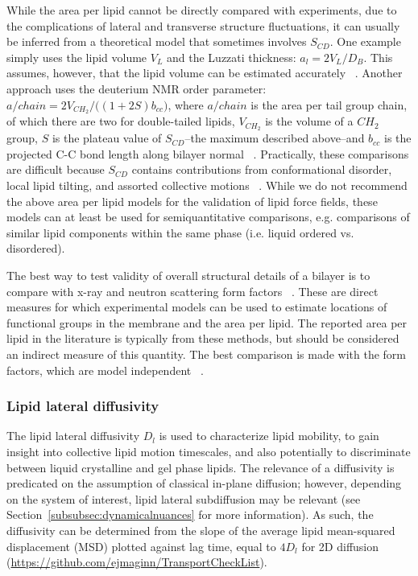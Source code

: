 \documentclass[9pt,bestpractices,pubversion]{livecoms}
\begin{document}
While the area per lipid cannot be directly compared with experiments, due to the complications of lateral and transverse structure fluctuations, it can usually be inferred from a theoretical model that sometimes involves $S_{CD}$.
One example simply uses the lipid volume $V_L$ and the Luzzati thickness: $a_l=2V_L/D_B$.
This assumes, however, that the lipid volume can be estimated accurately ~\cite{Poger2016}.
Another approach uses the deuterium NMR order parameter: $a/chain=2V_{CH_2}/\big((1+2S)b_{cc}\big)$, where $a/chain$ is the area per tail group chain, of which there are two for double-tailed lipids, $V_{CH_2}$ is the volume of a $CH_2$ group, $S$ is the plateau value of $S_{CD}$--the maximum described above--and $b_{cc}$ is the projected C-C bond length along bilayer normal ~\cite{Nagle1993}.
Practically, these comparisons are difficult because $S_{CD}$ contains contributions from conformational disorder, local lipid tilting, and assorted collective motions ~\cite{Venable2015}.
While we do not recommend the above area per lipid models for the validation of lipid force fields, these models can at least be used for semiquantitative comparisons, e.g. comparisons of similar lipid components within the same phase (i.e. liquid ordered vs. disordered).

The best way to test validity of overall structural details of a bilayer is to compare with x-ray and neutron scattering form factors ~\cite{Ollila2016,Klauda2006a,Benz2005}.
These are direct measures for which experimental models can be used to estimate locations of functional groups in the membrane and the area per lipid.
The reported area per lipid in the literature is typically from these methods, but should be considered an indirect measure of this quantity.
The best comparison is made with the form factors, which are model independent ~\cite{Klauda2006a}.

\subsubsection{Lipid lateral diffusivity}
\label{subsubsec:latdiff}
The lipid lateral diffusivity $D_l$ is used to characterize lipid mobility, to gain insight into collective lipid motion timescales, and also potentially to discriminate between liquid crystalline and gel phase lipids.
The relevance of a diffusivity is predicated on the assumption of classical in-plane diffusion; however, depending on the system of interest, lipid lateral subdiffusion may be relevant (see Section~\ref{subsubsec:dynamicalnuances} for more information).
As such, the diffusivity can be determined from the slope of the average lipid mean-squared displacement (MSD) plotted against lag time, equal to $4D_l$ for 2D diffusion (\url{https://github.com/ejmaginn/TransportCheckList}).
\end{document}
